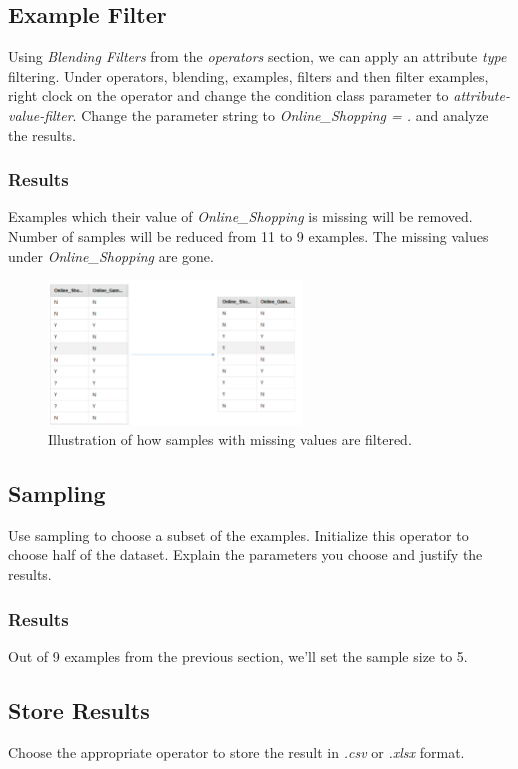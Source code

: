 \documentclass[12pt]{article}
\numberwithin{equation}{section}
\numberwithin{table}{section}
\numberwithin{figure}{section}
\begin{document}
\subsection*{Example Filter}
Using \textit{Blending Filters} from the \textit{operators} section, we can apply an attribute \textit{type} filtering. Under operators, blending, examples, filters and then filter examples, right clock on the operator and change the condition class parameter to \textit{attribute-value-filter}. Change the parameter string to \textit{Online\_Shopping = .} and analyze the results.
\subsubsection*{Results}
Examples which their value of \textit{Online\_Shopping} is missing will be removed. Number of samples will be reduced from 11 to 9 examples. The missing values under \textit{Online\_Shopping} are gone.
\begin{figure}[!h]\centering
	\includegraphics[width=0.6\textwidth]{2_beforeafter.png}
	\caption{Illustration of how samples with missing values are filtered.}
	\label{pl1}
\end{figure}

\subsection*{Sampling}
Use sampling to choose a subset of the examples. Initialize this operator to choose half of the dataset. Explain the parameters you choose and justify the results.
\subsubsection*{Results}
Out of 9 examples from the previous section, we'll set the sample size to 5. 

\subsection*{Store Results}
Choose the appropriate operator to store the result in \textit{.csv} or \textit{.xlsx} format.
\end{document}
